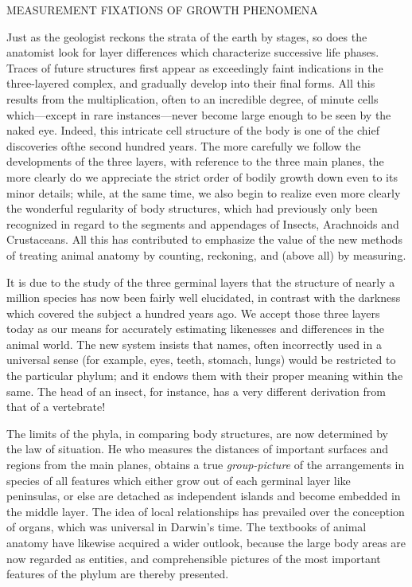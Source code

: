 MEASUREMENT FIXATIONS OF GROWTH PHENOMENA

Just as the geologist reckons the strata of the earth by stages, so does the anatomist look for
layer differences which characterize successive life phases. Traces of future structures first
appear as exceedingly faint indications in the three-layered complex, and gradually develop
into their final forms. All this results from the multiplication, often to an incredible degree, of
minute cells which—except in rare instances—never become large enough to be seen by the
naked eye. Indeed, this intricate cell structure of the body is one of the chief discoveries ofthe second hundred years. The more carefully we follow the developments of the three
layers, with reference to the three main planes, the more clearly do we appreciate the strict
order of bodily growth down even to its minor details; while, at the same time, we also begin
to realize even more clearly the wonderful regularity of body structures, which had
previously only been recognized in regard to the segments and appendages of Insects,
Arachnoids and Crustaceans. All this has contributed to emphasize the value of the new
methods of treating animal anatomy by counting, reckoning, and (above all) by measuring.

It is due to the study of the three germinal layers that the structure of nearly a million species
has now been fairly well elucidated, in contrast with the darkness which covered the subject a
hundred years ago. We accept those three layers today as our means for accurately estimating
likenesses and differences in the animal world. The new system insists that names, often
incorrectly used in a universal sense (for example, eyes, teeth, stomach, lungs) would be
restricted to the particular phylum; and it endows them with their proper meaning within the
same. The head of an insect, for instance, has a very different derivation from that of a
vertebrate!

The limits of the phyla, in comparing body structures, are now determined by the law of
situation. He who measures the distances of important surfaces and regions from the main
planes, obtains a true \textit{group-picture} of the arrangements in species of all features which
either grow out of each germinal layer like peninsulas, or else are detached as independent
islands and become embedded in the middle layer. The idea of local relationships has
prevailed over the conception of organs, which was universal in Darwin's time. The
textbooks of animal anatomy have likewise acquired a wider outlook, because the large body
areas are now regarded as entities, and comprehensible pictures of the most important
features of the phylum are thereby presented.

